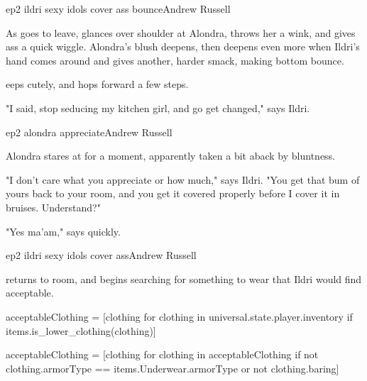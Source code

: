 \documentclass{book}
\begin{document}
\begin{childnode}{ep2 ildri sexy idols cover ass bounce}{Andrew Russell}

    As \name{} goes to leave, \heshe{} glances over \hisher{} shoulder at Alondra, throws her a wink, and gives \hisher{} ass a quick wiggle. Alondra's blush deepens,
    then deepens even more when Ildri's hand comes around and gives \name{} another, harder smack, making \names{} bottom bounce. 

    \name{} eeps cutely, and hops forward a few steps.

    "I said, stop seducing my kitchen girl, and go get changed," says Ildri.


\end{childnode}

\begin{childnode}{ep2 alondra appreciate}{Andrew Russell}

    Alondra stares at \name{} for a moment, apparently taken a bit aback by \names{} bluntness. 

    "I don't care what you appreciate or how much," says Ildri. "You get that bum of yours back to your room, and you get it covered properly before I cover it in bruises. Understand?"

    "Yes ma'am," says \name{} quickly.



\end{childnode}

\begin{childnode}{ep2 ildri sexy idols cover ass}{Andrew Russell}

    \name{} returns to \hisher{} room, and begins searching for something to wear that Ildri would find acceptable.

    \begin{code}

        acceptableClothing = [clothing for clothing in universal.state.player.inventory if items.is\_lower\_clothing(clothing)]

        acceptableClothing = [clothing for clothing in acceptableClothing if not clothing.armorType == items.Underwear.armorType or not clothing.baring]

    \end{code}



\end{childnode}
\end{document}
